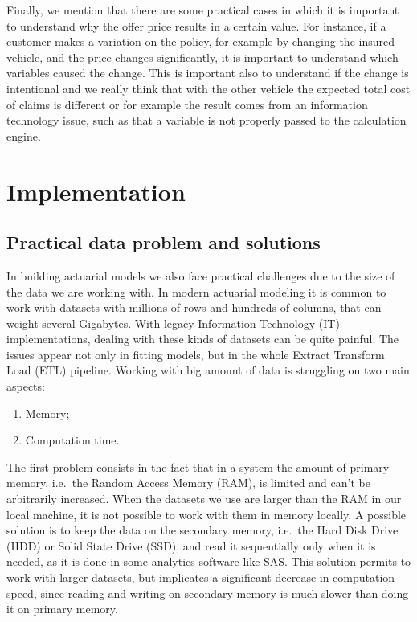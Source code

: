 \documentclass[a4paper, nobind]{templates/ociamthesis}
\providecommand{\tightlist}{%
  \setlength{\itemsep}{0pt}\setlength{\parskip}{0pt}}
\theoremstyle{definition}
\theoremstyle{definition}
\theoremstyle{definition}
\theoremstyle{remark}
\begin{document}
Finally, we mention that there are some practical cases in which it is important to understand why the offer price results in a certain value. For instance, if a customer makes a variation on the policy, for example by changing the insured vehicle, and the price changes significantly, it is important to understand which variables caused the change. This is important also to understand if the change is intentional and we really think that with the other vehicle the expected total cost of claims is different or for example the result comes from an information technology issue, such as that a variable is not properly passed to the calculation engine.

\newpage

\hypertarget{chap:implementation}{%
\section{Implementation}\label{chap:implementation}}

\hypertarget{practical-data-problem-and-solutions}{%
\subsection{Practical data problem and solutions}\label{practical-data-problem-and-solutions}}

In building actuarial models we also face practical challenges due to the size of the data we are working with. In modern actuarial modeling it is common to work with datasets with millions of rows and hundreds of columns, that can weight several Gigabytes. With legacy Information Technology (IT) implementations, dealing with these kinds of datasets can be quite painful. The issues appear not only in fitting models, but in the whole Extract Transform Load (ETL) pipeline. Working with big amount of data is struggling on two main aspects:

\begin{enumerate}
\def\labelenumi{\arabic{enumi}.}
\tightlist
\item
  Memory;
\item
  Computation time.
\end{enumerate}

The first problem consists in the fact that in a system the amount of primary memory, i.e.~the Random Access Memory (RAM), is limited and can't be arbitrarily increased. When the datasets we use are larger than the RAM in our local machine, it is not possible to work with them in memory locally. A possible solution is to keep the data on the secondary memory, i.e.~the Hard Disk Drive (HDD) or Solid State Drive (SSD), and read it sequentially only when it is needed, as it is done in some analytics software like SAS. This solution permits to work with larger datasets, but implicates a significant decrease in computation speed, since reading and writing on secondary memory is much slower than doing it on primary memory.
\end{document}
